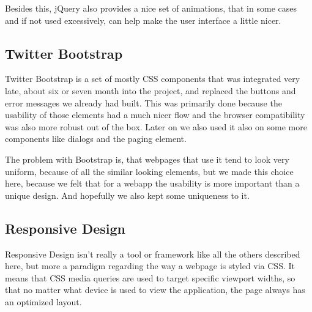Besides this, jQuery also provides a nice set of animations, that in some cases and if not used excessively, can help make the user interface a little nicer.

\subsection{Twitter Bootstrap}

Twitter Bootstrap is a set of mostly CSS components that was integrated very late, about six or seven month into the project, and replaced the buttons and error messages we already had built. This was primarily done because the usability of those elements had a much nicer flow and the browser compatibility was also more robust out of the box.
Later on we also used it also on some more components like dialogs and the paging element.

The problem with Bootstrap is, that webpages that use it tend to look very uniform, because of all the similar looking elements, but we made this choice here, because we felt that for a webapp the usability is more important than a unique design. And hopefully we also kept some uniqueness to it.

\subsection{Responsive Design}

Responsive Design isn't really a tool or framework like all the others described here, but more a paradigm regarding the way a webpage is styled via CSS. It means that CSS media queries are used to target specific viewport widths, so that no matter what device is used to view the application, the page always has an optimized layout.